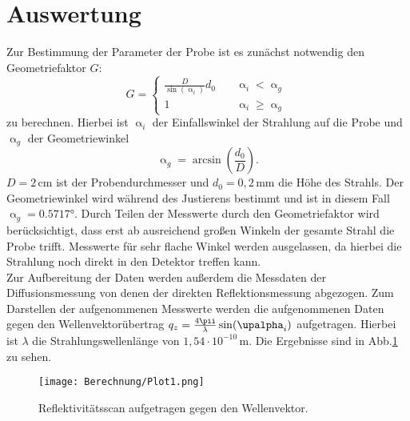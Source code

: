 \section{Auswertung}
Zur Bestimmung der Parameter der Probe ist es zunächst notwendig den Geometriefaktor $G$:
\begin{equation}
  G =
     \begin{cases}
       \frac{D}{\sin\left(\upalpha_i\right)}{d_0} &\quad\upalpha_i<\upalpha_g\\
       1 &\quad\upalpha_i\geq\upalpha_g
     \end{cases}
\end{equation}
zu berechnen. Hierbei ist $\upalpha_i$ der Einfallswinkel der Strahlung auf die Probe und $\upalpha_g$ der Geometriewinkel
\begin{equation}
\upalpha_g=\arcsin(\frac{d_0}{D}).
\end{equation}
$D=2\,\si{\cm}$ ist der Probendurchmesser und $d_0=0{,}2\,\si{\mm}$ die Höhe des Strahls. Der Geometriewinkel wird während des Justierens bestimmt und ist in diesem Fall $\upalpha_g=0.5717°$.
Durch Teilen der Messwerte durch den Geometriefaktor wird berücksichtigt, dass erst ab ausreichend großen Winkeln der gesamte Strahl die Probe trifft. Messwerte für sehr flache Winkel werden ausgelassen, da hierbei die Strahlung noch direkt in den Detektor treffen kann.\\
Zur Aufbereitung der Daten werden außerdem die Messdaten der Diffusionsmessung von denen der direkten Reflektionsmessung abgezogen. Zum Darstellen der aufgenommenen Messwerte werden die aufgenommenen Daten gegen den Wellenvektorübertrag $q_z=\frac{4\pii}{\lambda}\sin(\upalpha_i)$ aufgetragen. Hierbei ist $\lambda$ die Strahlungswellenlänge von $1{,}54\cdot10^{-10}\,\si{\m}$. Die Ergebnisse sind in Abb.\ref{Plot1} zu sehen.
\begin{figure}[H]
  \centering
  \texttt{[image: Berechnung/Plot1.png]}
  \caption{Reflektivitätsscan aufgetragen gegen den Wellenvektor.}
  \label{Plot1}
\end{figure}
